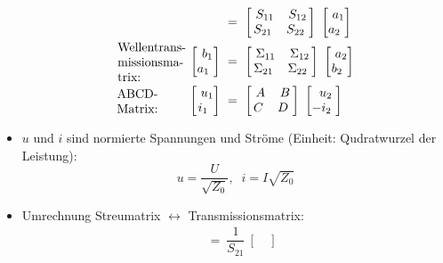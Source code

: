 \begin{itemize}
\begin{align*}
        &=\
        \begin{bmatrix}\
            S_{11} & S_{12}\\
            S_{21} & S_{22}\
        \end{bmatrix}\
        \begin{bmatrix}\
            a_1\\
            a_2\
        \end{bmatrix}\\
        \parbox{2cm}{Wellentrans- missionsmatrix:}
        \begin{bmatrix}\
            b_1\\
            a_1\
        \end{bmatrix}\
        &=\
        \begin{bmatrix}\
            \Sigma_{11} & \Sigma_{12}\\
            \Sigma_{21} & \Sigma_{22}\
        \end{bmatrix}\
        \begin{bmatrix}\
            a_2\\
            b_2\
        \end{bmatrix}\\
        \parbox{2cm}{ABCD-Matrix:}
        \begin{bmatrix}\
            u_1\\
            i_1\
        \end{bmatrix}\
        &=\
        \begin{bmatrix}\
            A & B\\
            C & D\
        \end{bmatrix}\
        \begin{bmatrix}\
            u_2\\
            -i_2\
        \end{bmatrix}\\
    \end{align*}
    \item $u$ und $i$ sind normierte Spannungen und Ströme (Einheit: Qudratwurzel der Leistung):
    \begin{equation*}
        u = \dfrac{U}{\sqrt{Z_0}},\;\; i = I \sqrt{Z_0}
    \end{equation*}
    \item Umrechnung Streumatrix $\leftrightarrow$ Transmissionsmatrix:
        \begin{align*}
            [\Sigma]\
            &=\
            \dfrac{1}{S_{21}}\
            \begin{bmatrix}\

\end{bmatrix}
\end{align*}
\end{itemize}
